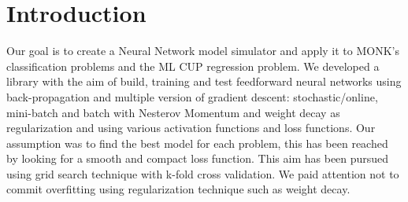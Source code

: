 \section{Introduction}
Our goal is to create a Neural Network model simulator and apply it to MONK's classification problems and the ML CUP regression problem. 
We developed a library with the aim of build, training and test feedforward neural networks using back-propagation and multiple version of gradient descent: stochastic/online, mini-batch and batch with Nesterov Momentum and weight decay as regularization and using various activation functions and loss functions. 
Our assumption was to find the best model for each problem, this has been reached by looking for a smooth  and compact loss function. This aim has been pursued using grid search technique with k-fold cross validation. We paid attention not to commit overfitting using regularization technique such as weight decay. 